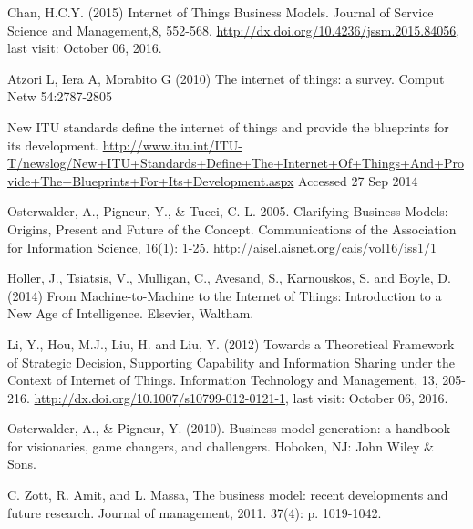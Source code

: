 \begin{thebibliography}{99}
	 Chan, H.C.Y. (2015) Internet of Things Business Models. Journal of Service Science and Management,8, 552-568. \url{http://dx.doi.org/10.4236/jssm.2015.84056}, last visit: October 06, 2016.

	 Atzori L, Iera A, Morabito G (2010) The internet of things: a survey. Comput Netw 54:2787-2805 

	 New ITU standards define the internet of things and provide the blueprints for its development. \url{http://www.itu.int/ITU-T/newslog/New+ITU+Standards+Define+The+Internet+Of+Things+And+Provide+The+Blueprints+For+Its+Development.aspx} Accessed 27 Sep 2014 
	
	 Osterwalder, A., Pigneur, Y., \& Tucci, C. L. 2005. Clarifying Business Models: Origins, Present and Future of the Concept. Communications of the Association for Information Science, 16(1): 1-25. \url{http://aisel.aisnet.org/cais/vol16/iss1/1}

	 Holler, J., Tsiatsis, V., Mulligan, C., Avesand, S., Karnouskos, S. and Boyle, D. (2014) From Machine-to-Machine to the Internet of Things: Introduction to a New Age of Intelligence. Elsevier, Waltham.

	 Li, Y., Hou, M.J., Liu, H. and Liu, Y. (2012) Towards a Theoretical Framework of Strategic Decision, Supporting Capability and Information Sharing under the Context of Internet of Things. Information Technology and Management, 13, 205-216. \url{http://dx.doi.org/10.1007/s10799-012-0121-1}, last visit: October 06, 2016.

	 Osterwalder, A., \& Pigneur, Y. (2010). Business model generation: a handbook for visionaries, game changers, and challengers. Hoboken, NJ: John Wiley \& Sons. 

	 C. Zott, R. Amit, and L. Massa, The business model: recent developments and future research. Journal of management, 2011. 37(4): p. 1019-1042. 
 
 \end{thebibliography}

